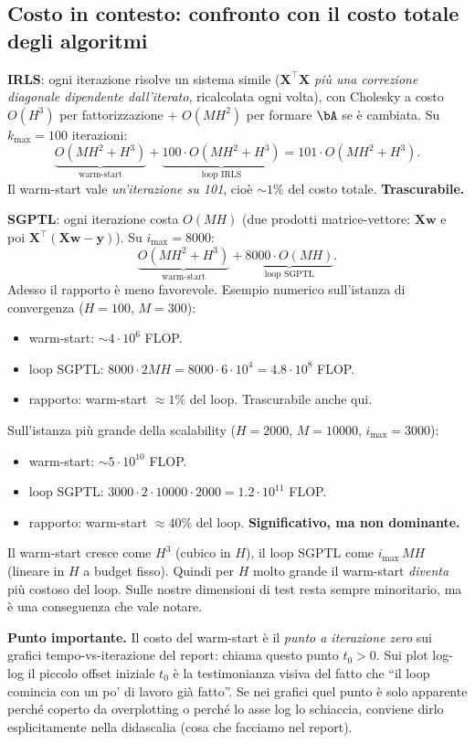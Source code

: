 \documentclass[11pt,a4paper]{article}
\newcommand{\bw}{\mathbf{w}}
\newcommand{\by}{\mathbf{y}}
\newcommand{\bX}{\mathbf{X}}
\theoremstyle{definition}
\begin{document}
\subsection{Costo in contesto: confronto con il costo totale degli algoritmi}

\textbf{IRLS}: ogni iterazione risolve un sistema simile ($\bX^\top\bX$ \emph{più una correzione diagonale dipendente dall'iterato}, ricalcolata ogni volta), con Cholesky a costo $O(H^3)$ per fattorizzazione + $O(MH^2)$ per formare $\bA$ se è cambiata. Su $k_{\max}=100$ iterazioni:
\[
\underbrace{O(MH^2 + H^3)}_{\text{warm-start}} + \underbrace{100 \cdot O(MH^2 + H^3)}_{\text{loop IRLS}} = 101 \cdot O(MH^2 + H^3).
\]
Il warm-start vale \emph{un'iterazione su 101}, cioè $\sim 1\%$ del costo totale. \textbf{Trascurabile.}

\smallskip
\textbf{SGPTL}: ogni iterazione costa $O(MH)$ (due prodotti matrice-vettore: $\bX\bw$ e poi $\bX^\top(\bX\bw-\by)$). Su $i_{\max}=8000$:
\[
\underbrace{O(MH^2 + H^3)}_{\text{warm-start}} + \underbrace{8000 \cdot O(MH)}_{\text{loop SGPTL}}.
\]
Adesso il rapporto è meno favorevole. Esempio numerico sull'istanza di convergenza ($H=100$, $M=300$):
\begin{itemize}[leftmargin=*]
\item warm-start: $\sim 4\cdot 10^6$ FLOP.
\item loop SGPTL: $8000 \cdot 2 MH = 8000 \cdot 6\cdot 10^4 = 4.8\cdot 10^8$ FLOP.
\item rapporto: warm-start $\approx 1\%$ del loop. Trascurabile anche qui.
\end{itemize}
Sull'istanza più grande della scalability ($H=2000$, $M=10000$, $i_{\max}=3000$):
\begin{itemize}[leftmargin=*]
\item warm-start: $\sim 5\cdot 10^{10}$ FLOP.
\item loop SGPTL: $3000 \cdot 2\cdot 10000\cdot 2000 = 1.2\cdot 10^{11}$ FLOP.
\item rapporto: warm-start $\approx 40\%$ del loop. \textbf{Significativo, ma non dominante.}
\end{itemize}
Il warm-start cresce come $H^3$ (cubico in $H$), il loop SGPTL come $i_{\max}\,MH$ (lineare in $H$ a budget fisso). Quindi per $H$ molto grande il warm-start \emph{diventa} più costoso del loop. Sulle nostre dimensioni di test resta sempre minoritario, ma è una conseguenza che vale notare.

\begin{tcolorbox}[warning]
\textbf{Punto importante.} Il costo del warm-start è il \emph{punto a iterazione zero} sui grafici tempo-vs-iterazione del report: chiama questo punto $t_0 > 0$. Sui plot log-log il piccolo offset iniziale $t_0$ è la testimonianza visiva del fatto che ``il loop comincia con un po' di lavoro già fatto''. Se nei grafici quel punto è solo apparente perché coperto da overplotting o perché lo asse log lo schiaccia, conviene dirlo esplicitamente nella didascalia (cosa che facciamo nel report).
\end{tcolorbox}
\end{document}
